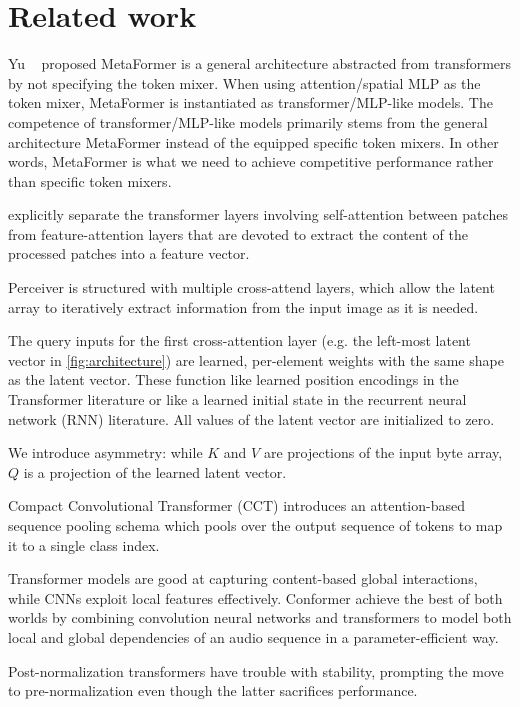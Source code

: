 \section{Related work}
\label{sec:related}

Yu \etal~\cite{yu2022metaformer} proposed MetaFormer is a general architecture abstracted from transformers by not specifying the token mixer. When using attention/spatial MLP as the token mixer, MetaFormer is instantiated as transformer/MLP-like models. The competence of transformer/MLP-like models primarily stems from the general architecture MetaFormer instead of the equipped specific token mixers. In other words, MetaFormer is what we need to achieve competitive performance rather than specific token mixers.

\cite{touvron2021going} explicitly separate the transformer layers involving self-attention between patches from feature-attention layers that are devoted to extract the content of the processed patches into a feature vector.

\cite{jaegle2021perceiver} Perceiver is structured with multiple cross-attend layers, which allow the latent array to iteratively extract information from the input image as it is needed.

The query inputs for the first cross-attention layer (e.g. the left-most latent vector in \cref{fig:architecture}) are learned, per-element weights with the same shape as the latent vector. These function like learned position encodings in the Transformer literature or like a learned initial state in the recurrent neural network (RNN) literature. All values of the latent vector are initialized to zero.

We introduce asymmetry: while $K$ and $V$ are projections of the input byte array, $Q$ is a projection of the learned latent vector.

Compact Convolutional Transformer (CCT) \cite{hassani2021escaping} introduces an attention-based sequence pooling schema which pools over the output sequence of tokens to map it to a single class index.

\cite{gulati2020conformer} Transformer models are good at capturing content-based global interactions, while CNNs exploit local features effectively. Conformer achieve the best of both worlds by combining convolution neural networks and transformers to model both local and global dependencies of an audio sequence in a parameter-efficient way.

\cite{xiong2020layer} Post-normalization transformers have trouble with stability, prompting the move to pre-normalization even though the latter sacrifices performance.

